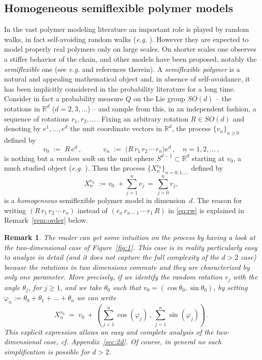 \documentclass[a4paper,reqno,11pt]{amsart}
\numberwithin{equation}{section}
\newtheorem{rem}[theorem]{Remark}
\newcommand{\gp}{\varphi}
\newcommand{\R}{\mathbb{R}}
\begin{document}
\subsection{Homogeneous semiflexible polymer models}
In the vast polymer modeling literature an important role is played
by random walks, in fact self-avoiding random walks ({\sl e.g.} \cite{cf:Freed,cf:scaling}).
However they are expected to model properly real polymers
only on large scales. On shorter scales one observes a stiffer behavior
of the chain,  and other models
have been proposed, notably  the {\sl semiflexible} one (see {\sl e.g.} \cite{cf:MarkoSiggia,cf:WN}
and references therein).
A {\sl semiflexible polymer} is a natural and appealing mathematical
object and, in absence of self-avoidance,
it has been implicitly considered in the probability  literature
for a long time. 
Consider in fact a probability measure $Q$ on the Lie group $SO(d)$ --
the rotations in $\R^d$ ($d=2,3,\ldots$) -- and sample from this, in an independent
fashion, a sequence of rotations $r_1, r_2, \ldots\,$.
Fixing an arbitrary rotation $R \in SO(d)$ and denoting by
$e^1, \ldots, e^d$ the unit coordinate vectors in $\R^d$,
the process $\{v_n\}_{n \ge 0}$ defined by
\begin{equation} \label{eq:rw}
v_0 \;:=\; R\, e^d \,, \qquad \quad
v_n \;:=\; \big(R\, r_1\, r_2\, \cdots \, r_n \big) e^d\,, \quad n=1, 2 , \ldots \,,
\end{equation}
is nothing but a {\sl random walk} on the unit sphere $S^{d-1} \subset \R^d$
starting at $v_0$, a much studied object ({\sl e.g.} \cite{cf:RobUrs,cf:Ros}).
Then the process $\{X_n^{v_0}\}_{n=0, 1, \ldots}$ defined by
\begin{equation}
\label{eq:Xhomogeneous}
X_n^{v_0} \; := v_0 \; + \sum_{j=1}^n v_j\, =\, \sum_{j=0}^n v_j,
\end{equation}
is a {\sl homogeneous} semiflexible polymer model in dimension~$d$.
The reason for writing $(R \, r_1\, r_2\, \cdots \, r_n)$ instead
of $(r_n\, r_{n-1}\, \cdots \, r_1 \, R)$ in \eqref{eq:rw} is explained
in Remark~\ref{rem:order} below.




\medskip
\begin{rem}\label{rem:2dsimple}
\rm The reader can get some intuition on the process by having a look at 
the two-dimensional case of Figure~\ref{fig:1}. This case
is in reality particularly 
easy to analyze in detail (and it does not capture the full
complexity of the $d>2$ case) because the rotations in two
dimensions commute and they 
are characterized by only one parameter.
More precisely, if we identify the random rotation $r_j$
with the angle $\theta_j$, for $j \ge 1$, and we take $\theta_0$
such that $v_0 = (\cos \theta_0, \sin \theta_0)$, by setting
$\gp_n:= \theta_0 + \theta_1 + \ldots +
\theta_n$ we can write
\begin{equation}
	X_n^{v_0} \; =\; v_0 \,+\, \left( \sum_{j=1}^n \cos(\gp_j) \,,\,  
	\sum_{j=1}^n \sin(\gp_j)\right) \,.
\end{equation}
This explicit expression allows an easy and complete
analysis of the two-dimensional case, {\sl cf.} Appendix~\ref{sec:2d}.
Of course, in general no such simplification is possible for $d > 2$.
\end{rem}
\end{document}

